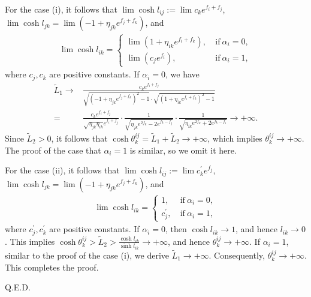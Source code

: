 \documentclass[12pt]{amsart}
\theoremstyle{definition}
\def\qed{\hfill{Q.E.D.}\smallskip}
\begin{document}
For the case (i), it follows that $\lim\cosh l_{ij}:=\lim c_ke^{f_i+f_j}$, $\lim\cosh l_{jk}=\lim (-1+\eta_{jk}e^{f_j+f_k})$, and
\begin{eqnarray*}
\lim\cosh l_{ik}=
\begin{cases}
\lim (1+\eta_{ik}e^{f_i+f_k}),\ & \text{if}\ \alpha_i=0,  \\
\lim(c_je^{f_i}),\ & \text{if}\ \alpha_i=1,
\end{cases}
\end{eqnarray*}
where $c_j,c_k$ are positive constants.
If $\alpha_i=0$, we have
\begin{equation*}
\begin{aligned}
\widetilde{L}_1\rightarrow&\frac{c_ke^{f_i+f_j}}
{\sqrt{(-1+\eta_{jk}e^{f_j+f_k})^2-1}\cdot
\sqrt{(1+\eta_{ik}e^{f_i+f_k})^2-1}}\\
=&\frac{c_ke^{f_i+f_j}}
{\sqrt{\eta_{jk}\eta_{ik}}e^{f_i+f_j}}\cdot
\frac{1}{\sqrt{\eta_{jk}e^{2f_k}-2e^{f_k-f_j}}}\cdot
\frac{1}{\sqrt{\eta_{ik}e^{2f_k}+2e^{f_k-f_i}}}
\rightarrow+\infty.
\end{aligned}
\end{equation*}
Since $\widetilde{L}_2>0$, it follows that $\cosh \theta^{ij}_k=\widetilde{L}_1+\widetilde{L}_2\rightarrow +\infty$,
which implies $\theta^{ij}_k\rightarrow +\infty$.
The proof of the case that $\alpha_i=1$ is similar, so we omit it here.

For the case (ii), it follows that $\lim\cosh l_{ij}:=\lim c^\prime_ke^{f_j}$, $\lim\cosh l_{jk}=\lim (-1+\eta_{jk}e^{f_j+f_k})$, and
\begin{eqnarray*}
\lim\cosh l_{ik}=
\begin{cases}
1,\ & \text{if}\ \alpha_i=0,  \\
c^\prime_j,\ & \text{if}\ \alpha_i=1,
\end{cases}
\end{eqnarray*}
where $c^\prime_j,c^\prime_k$ are positive constants.
If $\alpha_i=0$, then $\cosh l_{ik}\rightarrow 1$, and hence $l_{ik}\rightarrow 0$.
This implies $\cosh \theta^{ij}_k>\widetilde{L}_2>\frac{\cosh l_{ik}}{\sinh l_{ik}}\rightarrow +\infty$, and hence
$\theta^{ij}_k\rightarrow +\infty$.
If $\alpha_i=1$, similar to the proof of the case (i), we derive $\widetilde{L}_1\rightarrow +\infty$.
Consequently, $\theta^{ij}_k\rightarrow +\infty$.
This completes the proof.

\qed
\end{document}
